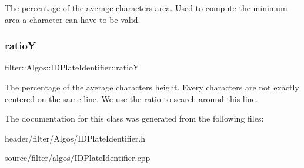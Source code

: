 The percentage of the average characters\textquotesingle{} area. Used to compute the minimum area a character can have to be valid. \mbox{\label{classfilter_1_1_algos_1_1_i_d_plate_identifier_a46ee09888147ccaee5c647abe27ff7b0}} 
\subsubsection{\texorpdfstring{ratioY}{ratioY}}
{\footnotesize\ttfamily filter\+::\+Algos\+::\+I\+D\+Plate\+Identifier\+::ratioY}

The percentage of the average characters\textquotesingle{} height. Every characters are not exactly centered on the same line. We use the ratio to search around this line. 

The documentation for this class was generated from the following files\+:\begin{DoxyCompactItemize}
\item 
header/filter/\+Algos/I\+D\+Plate\+Identifier.\+h\item 
source/filter/algos/I\+D\+Plate\+Identifier.\+cpp\end{DoxyCompactItemize}
